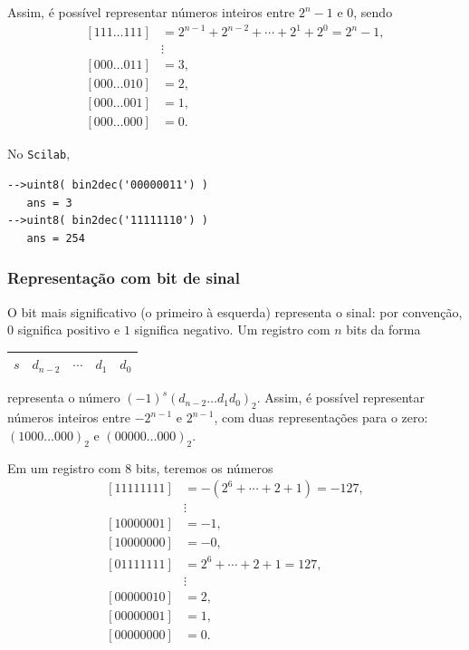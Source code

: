 Assim, é possível representar números inteiros entre $2^n-1$ e $0$, sendo
\begin{equation}
\begin{split}
  [111\ldots 111] & = 2^{n-1}+2^{n-2}+\cdots+2^1+2^0=2^n-1,\\
                &\vdots\\
  [000\ldots 011] &= 3, \\
  [000\ldots 010] &= 2, \\
  [000\ldots 001] &= 1, \\
  [000\ldots 000] & = 0.
\end{split}
\end{equation}

\ifisscilab
\begin{ex}
  No \verb+Scilab+,
\begin{verbatim}
-->uint8( bin2dec('00000011') )
   ans = 3
-->uint8( bin2dec('11111110') )
   ans = 254
\end{verbatim}
\end{ex}
\fi

\subsubsection{Representação com bit de sinal}
O bit mais significativo (o primeiro à esquerda) representa o sinal: por convenção, $0$ significa positivo e $1$ significa negativo. Um registro com $n$ bits da forma
\begin{center}
  \begin{tabular}{|c|c|c|c|c|} \hline
    $s$ & $d_{n-2}$ & $\cdots$ & $d_1$ & $d_0$ \\\hline
  \end{tabular}
\end{center}
representa o número $(-1)^s(d_{n-2}\ldots d_1d_0)_2$. Assim, é possível representar números inteiros entre $-2^{n-1}$ e $2^{n-1}$, com duas representações para o zero: $(1000\ldots 000)_2$ e $(00000\ldots 000)_2$.

\begin{ex}
Em um registro com $8$ bits, teremos os números
\begin{equation}
\begin{split}
 [11111111] &= -(2^{6}+\cdots+2+1)=-127,\\
 &\vdots    \\
 [10000001] &= -1, \\
 [10000000] &= -0, \\
 [01111111] &= 2^6+\cdots+2+1=127, \\
 &\vdots    \\
 [00000010] &= 2, \\
 [00000001] &= 1, \\
 [00000000] &= 0.
\end{split}
\end{equation}
\end{ex}


